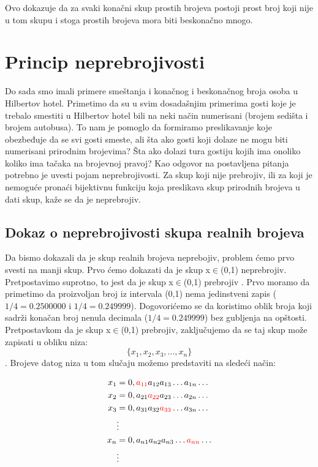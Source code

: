 \documentclass[a4paper]{article}
\begin{document}
Ovo dokazuje da za svaki konačni skup prostih brojeva postoji prost broj koji nije u tom skupu i stoga prostih brojeva mora biti beskonačno mnogo.

\section{Princip neprebrojivosti}
\label{poglavlje:Princip neprebrojivosti}

\newline

Do sada smo imali primere smeštanja i konačnog i beskonačnog broja osoba u Hilbertov hotel. Primetimo da su u svim dosadašnjim primerima gosti koje je trebalo smestiti u Hilbertov hotel bili na neki način numerisani (brojem sedišta i brojem autobusa). To nam je pomoglo da formiramo preslikavanje koje obezbeđuje da se svi gosti smeste, ali šta ako gosti koji dolaze ne mogu biti numerisani prirodnim brojevima? Šta ako dolazi tura gostiju kojih ima onoliko koliko ima tačaka na brojevnoj pravoj? 
\newline
Kao odgovor na postavljena pitanja potrebno je uvesti pojam neprebrojivosti. Za skup koji nije prebrojiv, ili za koji je nemoguće pronaći bijektivnu funkciju koja preslikava skup prirodnih brojeva u dati skup, kaže se da je neprebrojiv. 
\subsection{Dokaz o neprebrojivosti skupa realnih brojeva}

Da bismo dokazali da je skup realnih brojeva neprebojiv, problem ćemo prvo svesti na manji skup. 
Prvo ćemo dokazati da je skup x$\in$(0,1) neprebrojiv.
\newline
Pretpostavimo suprotno, to jest da je skup x$\in$(0,1) prebrojiv \cite{matematicka_logika}. Prvo moramo da primetimo da proizvoljan broj iz intervala (0,1) nema jedinstveni zapis ($1/4=0.2500000$ i $1/4=0.249999$). Dogovorićemo se da koristimo oblik broja koji sadrži konačan broj nenula decimala ($1/4=0.249999$) bez gubljenja na opštosti. Pretpostavkom da je skup x$\in$(0,1) prebrojiv, zaključujemo da se taj skup može zapisati u obliku niza: $$\{x_{1},x_{2},x_{3},...,x_{n}\}$$.
\newline
Brojeve datog niza u tom slučaju možemo predstaviti na sledeći način:

\begin{align*}
    x_{1} & = 0,\color{red}a_{11}\color{black}a_{12}a_{13} \ldots a_{1n} \ldots \\
    x_{2} & = 0,a_{21}\color{red}a_{22}\color{black}a_{23} \ldots a_{2n} \ldots \\
    x_{3} & = 0,a_{31}a_{32}\color{red}a_{33}\color{black} \ldots a_{3n} \ldots \\
    & \vdots \\
    x_{n} & = 0,a_{n1}a_{n2}a_{n3} \ldots \color{red} a_{nn} \color{black} \ldots \\
    & \vdots 
\end{align*}
\end{document}
